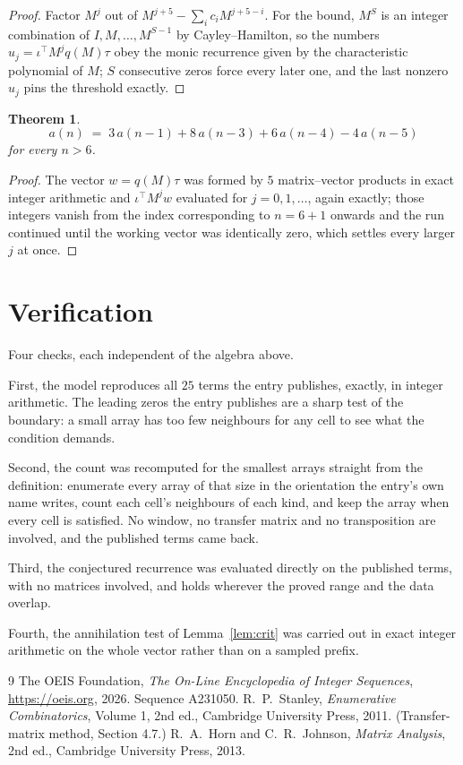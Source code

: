 \documentclass[11pt,a4paper]{article}
\theoremstyle{plain}
\newtheorem{theorem}{Theorem}
\theoremstyle{definition}
\begin{document}
\begin{proof}
Factor $M^{j}$ out of $M^{j+5}-\sum_ic_iM^{j+5-i}$. For the bound, $M^{S}$
is an integer combination of $I,M,\dots,M^{S-1}$ by Cayley--Hamilton, so the numbers
$u_j=\iota^{\!\top}M^{j}q(M)\tau$ obey the monic recurrence given by the characteristic
polynomial of $M$; $S$ consecutive zeros force every later one, and the last nonzero $u_j$
pins the threshold exactly.
\end{proof}

\begin{theorem}
\[
a(n)\;=\;3\,a(n-1) + 8\,a(n-3) + 6\,a(n-4) - 4\,a(n-5)
\]
for every $n>6$.
\end{theorem}

\begin{proof}
The vector $w=q(M)\tau$ was formed by $5$ matrix--vector products in exact integer
arithmetic and $\iota^{\!\top}M^{j}w$ evaluated for $j=0,1,\dots$, again exactly; those
integers vanish from the index corresponding to $n=6+1$ onwards and the run continued
until the working vector was identically zero, which settles every larger $j$ at once.
\end{proof}

\section{Verification}

Four checks, each independent of the algebra above.

First, the model reproduces all $25$ terms the entry publishes, exactly, in integer
arithmetic. The leading zeros the entry publishes are a sharp test of the boundary: a small
array has too few neighbours for any cell to see what the condition demands.

Second, the count was recomputed for the smallest arrays straight from the definition:
enumerate every array of that size in the orientation the entry's own name writes, count each
cell's neighbours of each kind, and keep the array when every cell is satisfied. No window, no
transfer matrix and no transposition are involved, and the published terms came back.

Third, the conjectured recurrence was evaluated directly on the published terms, with no
matrices involved, and holds wherever the proved range and the data overlap.

Fourth, the annihilation test of Lemma~\ref{lem:crit} was carried out in exact integer
arithmetic on the whole vector rather than on a sampled prefix.

\begin{thebibliography}{9}
 The OEIS Foundation, \emph{The On-Line Encyclopedia of Integer
Sequences}, \url{https://oeis.org}, 2026. Sequence A231050.
 R.~P.~Stanley, \emph{Enumerative Combinatorics}, Volume 1, 2nd ed.,
Cambridge University Press, 2011. (Transfer-matrix method, Section 4.7.)
 R.~A.~Horn and C.~R.~Johnson, \emph{Matrix Analysis}, 2nd ed., Cambridge
University Press, 2013.
\end{thebibliography}
\end{document}
